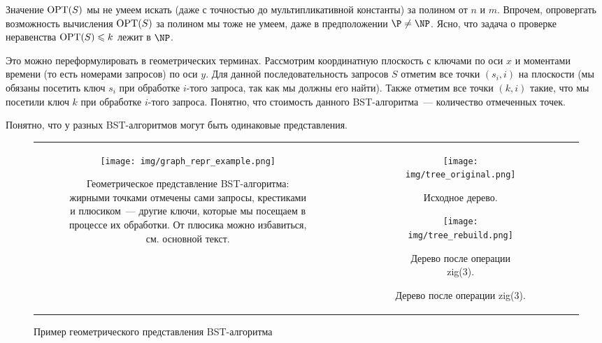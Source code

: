 Значение
$\operatorname{OPT}(S)$ мы не умеем искать (даже с точностью до мультипликативной
константы) за полином от $n$ и $m$.
Впрочем, опровергать возможность вычисления $\operatorname{OPT}(S)$
за полином мы тоже не умеем, даже в предположении $\P \neq \NP$. Ясно,
что задача о проверке неравенства $\operatorname{OPT}(S) \leqslant k$ лежит в $\NP$.

Это можно переформулировать в геометрических терминах. Рассмотрим координатную
плоскость с ключами по оси $x$ и моментами времени (то есть номерами запросов) по
оси $y$. Для данной последовательность запросов $S$ отметим все точки $(s_i, i)$
на плоскости (мы обязаны посетить ключ $s_i$ при обработке $i$-того
запроса, так как мы должны его найти). Также отметим все точки $(k, i)$ такие,
что мы посетили ключ $k$ при обработке $i$-того запроса. Понятно, что стоимость данного BST-алгоритма~--- количество отмеченных точек.


\begin{remark}
	Понятно, что у разных BST-алгоритмов могут быть одинаковые представления.
\end{remark}


\begin{figure}
	\centering
	\begin{tabular}{cc}

		\begin{subfigure}{0.6\textwidth}
			\centering
			\texttt{[image: img/graph\_repr\_example.png]}
			\caption{Геометрическое представление BST-алгоритма: жирными точками отмечены сами запросы, крестиками и плюсиком~--- другие ключи, которые мы посещаем в процессе их обработки. От плюсика можно избавиться, см. основной текст.}
			\label{repr_example_graph}
		\end{subfigure}

		 &

		\begin{subfigure}{0.4\textwidth}
			\centering
			\begin{subfigure}{0.4\textwidth}
				\texttt{[image: img/tree\_original.png]}
				\caption{Исходное дерево.}
				\label{repr_example_orig}
			\end{subfigure}

			\begin{subfigure}{0.4\textwidth}
				\texttt{[image: img/tree\_rebuild.png]}
				\caption{Дерево после операции \textrm{zig(3)}.}
				\label{repr_example_rebuild}
			\end{subfigure}
		\end{subfigure}

		\\
	\end{tabular}
	\caption{Пример геометрического представления BST-алгоритма}
	\label{repr_example}
\end{figure}

